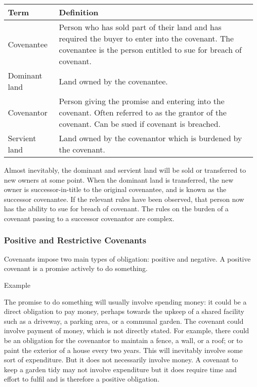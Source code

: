 \documentclass[
]{article}
\newenvironment{env-de3101d4-f08b-48eb-bc0e-2fa06f3bcf8e}
{
    \savenotes\tcolorbox[blanker,breakable,left=5pt,borderline west={2pt}{-4pt}{purple}]
}
{
    \endtcolorbox\spewnotes
}
\begin{document}
\begin{longtable}[]{@{}ll@{}}
\toprule()
Term & Definition \\
\midrule()
\endhead
Covenantee & Person who has sold part of their land and has required the
buyer to enter into the covenant. The covenantee is the person entitled
to sue for breach of covenant. \\
Dominant land & Land owned by the covenantee. \\
Covenantor & Person giving the promise and entering into the covenant.
Often referred to as the grantor of the covenant. Can be sued if
covenant is breached. \\
Servient land & Land owned by the covenantor which is burdened by the
covenant. \\
\bottomrule()
\end{longtable}

Almost inevitably, the dominant and servient land will be sold or
transferred to new owners at some point. When the dominant land is
transferred, the new owner is successor-in-title to the original
covenantee, and is known as the successor covenantee. If the relevant
rules have been observed, that person now has the ability to sue for
breach of covenant. The rules on the burden of a covenant passing to a
successor covenantor are complex.

\hypertarget{positive-and-restrictive-covenants}{%
\subsubsection{Positive and Restrictive
Covenants}\label{positive-and-restrictive-covenants}}

Covenants impose two main types of obligation: positive and negative. A
positive covenant is a promise actively to do something.

\begin{env-de3101d4-f08b-48eb-bc0e-2fa06f3bcf8e}

Example

The promise to do something will usually involve spending money: it
could be a direct obligation to pay money, perhaps towards the upkeep of
a shared facility such as a driveway, a parking area, or a communal
garden. The covenant could involve payment of money, which is not
directly stated. For example, there could be an obligation for the
covenantor to maintain a fence, a wall, or a roof; or to paint the
exterior of a house every two years. This will inevitably involve some
sort of expenditure. But it does not necessarily involve money. A
covenant to keep a garden tidy may not involve expenditure but it does
require time and effort to fulfil and is therefore a positive
obligation.

\end{env-de3101d4-f08b-48eb-bc0e-2fa06f3bcf8e}
\end{document}
